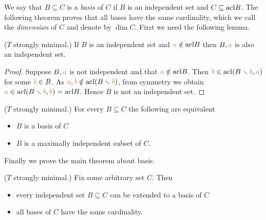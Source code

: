 We say that $B\subseteq C$ is a \emph{basis\/} of $C$ if $B$ is an independent set and $C\subseteq{\rm acl} B$.
The following theorem proves that all bases have the same cardinality, which we call the  \emph{dimension\/} of $C$ and denote by \emph{$\dim C$}.
First we need the following lemma.

\begin{lemma}\label{indipendenza+1}
  ($T$ strongly minimal.)
  If $B$ is an independent set and ${\color{brown} a}\notin {\rm acl} B$ then $B,{\color{brown} a}$ is also an independent set.
\end{lemma}
\begin{proof}
Suppose $B,{\color{brown} a}$ is not independent and that ${\color{brown} a}\notin {\rm acl} B$.
Then ${\color{brown} b}\in{\rm acl}(B\smallsetminus {\color{brown}b},{\color{brown} a})$ for some ${\color{brown} b}\in B$.
As ${\color{brown} a},{\color{brown} b}\notin{\rm acl}(B\smallsetminus {\color{brown}b})$, from symmetry we obtain ${\color{brown} a}\in{\rm acl}(B\smallsetminus {\color{brown}b},{\color{brown} b})={\rm acl} B$.
Hence $B$ is not an independent set.
\end{proof}

\begin{corollary}\label{basemassimale}
  ($T$ strongly minimal.)
  For every $B\subseteq C$ the following are equivalent
  \begin{itemize}
  \item[1.] $B$ is a basis of $C$
  \item[2.] $B$ is a maximally independent subset of $C$.
  \end{itemize}
\end{corollary}

Finally we prove the main theorem about basis.

\begin{theorem}\label{thm_cardinality_base}
  ($T$ strongly minimal.)
  Fix some arbitrary set $C$.
  Then
  \begin{itemize}
  \item[1.] every independent set $B\subseteq C$ can be extended to a basis of $C$
  \item[2.] all bases of $C$ have the same cardinality.
  \end{itemize}
\end{theorem}

